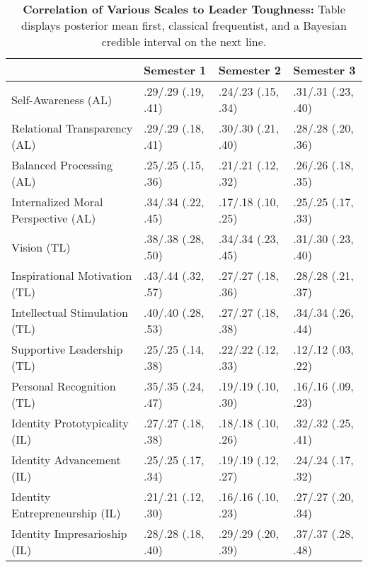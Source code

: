 \begin{table}[ht]
\centering
\begin{tabular}{llll}
  \hline
 & Semester 1 & Semester 2 & Semester 3 \\ 
  \hline
Self-Awareness (AL) & .29/.29 (.19, .41) & .24/.23 (.15, .34) & .31/.31 (.23, .40) \\ 
  Relational Transparency (AL) & .29/.29 (.18, .41) & .30/.30 (.21, .40) & .28/.28 (.20, .36) \\ 
  Balanced Processing (AL) & .25/.25 (.15, .36) & .21/.21 (.12, .32) & .26/.26 (.18, .35) \\ 
  Internalized Moral Perspective (AL) & .34/.34 (.22, .45) & .17/.18 (.10, .25) & .25/.25 (.17, .33) \\ 
  Vision (TL) & .38/.38 (.28, .50) & .34/.34 (.23, .45) & .31/.30 (.23, .40) \\ 
  Inspirational Motivation (TL) & .43/.44 (.32, .57) & .27/.27 (.18, .36) & .28/.28 (.21, .37) \\ 
  Intellectual Stimulation (TL) & .40/.40 (.28, .53) & .27/.27 (.18, .38) & .34/.34 (.26, .44) \\ 
  Supportive Leadership (TL) & .25/.25 (.14, .38) & .22/.22 (.12, .33) & .12/.12 (.03, .22) \\ 
  Personal Recognition (TL) & .35/.35 (.24, .47) & .19/.19 (.10, .30) & .16/.16 (.09, .23) \\ 
  Identity Prototypicality (IL) & .27/.27 (.18, .38) & .18/.18 (.10, .26) & .32/.32 (.25, .41) \\ 
  Identity Advancement (IL) & .25/.25 (.17, .34) & .19/.19 (.12, .27) & .24/.24 (.17, .32) \\ 
  Identity Entrepreneurship (IL) & .21/.21 (.12, .30) & .16/.16 (.10, .23) & .27/.27 (.20, .34) \\ 
  Identity Impresarioship (IL) & .28/.28 (.18, .40) & .29/.29 (.20, .39) & .37/.37 (.28, .48) \\ 
   \hline
\end{tabular}
\caption{\textbf{Correlation of Various Scales to Leader Toughness:} Table displays posterior mean first, classical frequentist, and a Bayesian credible interval on the next line.} 
\label{tab:lead_corr}
\end{table}
